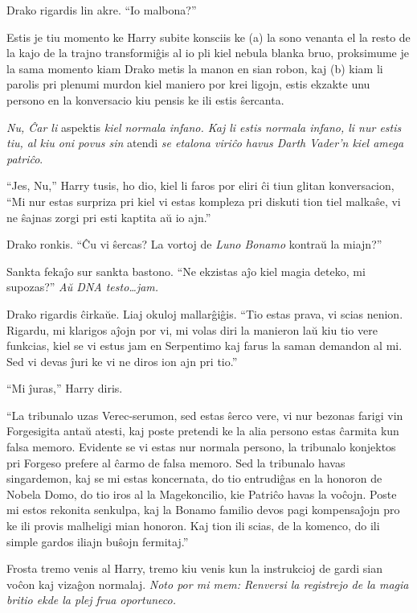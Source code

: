 Drako rigardis lin akre. ``Io malbona?''

Estis je tiu momento ke Harry subite konsciis ke (a) la sono venanta
el la resto de la kajo de la trajno transformiĝis al io pli kiel
nebula blanka bruo, proksimume je la sama momento kiam Drako metis la
manon en sian robon, kaj (b) kiam li parolis pri plenumi murdon kiel
maniero por krei ligojn, estis ekzakte unu persono en la konversacio
kiu pensis ke ili estis ŝercanta.

\emph{Nu, Ĉar li} aspektis \emph{kiel normala infano. Kaj li estis
  normala infano, li nur estis tiu, al kiu oni povus sin} atendi
\emph{ se etalona viriĉo havus Darth Vader'n kiel amega patriĉo}.

``Jes, Nu,'' Harry tusis, ho dio, kiel li faros por eliri ĉi tiun
glitan konversacion, ``Mi nur estas surpriza pri kiel vi estas
kompleza pri diskuti tion tiel malkaŝe, vi ne ŝajnas zorgi pri esti
kaptita aŭ io ajn.''

Drako ronkis. ``Ĉu vi ŝercas? La vortoj de \emph{Luno Bonamo}
kontraŭ la miajn?''

Sankta fekaĵo sur sankta bastono. ``Ne ekzistas aĵo kiel magia
deteko, mi supozas?'' \emph{Aŭ DNA testo\ldots jam.}


Drako rigardis ĉirkaŭe. Liaj okuloj mallarĝiĝis. ``Tio estas prava, vi
scias nenion. Rigardu, mi klarigos aĵojn por vi, mi volas diri la
manieron laŭ kiu tio vere funkcias, kiel se vi estus jam en Serpentimo
kaj farus la saman demandon al mi. Sed vi devas ĵuri ke vi ne diros ion ajn
pri tio.''

``Mi ĵuras,'' Harry diris.

``La tribunalo uzas Verec-serumon, sed estas ŝerco vere, vi nur
bezonas farigi vin Forgesigita antaŭ atesti, kaj poste pretendi ke la
alia persono estas ĉarmita kun falsa memoro. Evidente se vi estas nur
normala persono, la tribunalo konjektos pri Forgeso prefere al ĉarmo
de falsa memoro. Sed la tribunalo havas singardemon, kaj se mi estas
koncernata, do tio entrudiĝas en la honoron de Nobela Domo, do tio
iros al la Magekoncilio, kie Patriĉo havas la voĉojn. Poste mi estos
rekonita senkulpa, kaj la Bonamo familio devos pagi kompensaĵojn pro
ke ili provis malheligi mian honoron. Kaj tion ili scias, de la
komenco, do ili simple gardos iliajn buŝojn fermitaj.''

Frosta tremo venis al Harry, tremo kiu venis kun la instrukcioj de
gardi sian voĉon kaj vizaĝon normalaj. \emph{Noto por mi mem: Renversi
  la registrejo de la magia britio ekde la plej frua oportuneco.}

